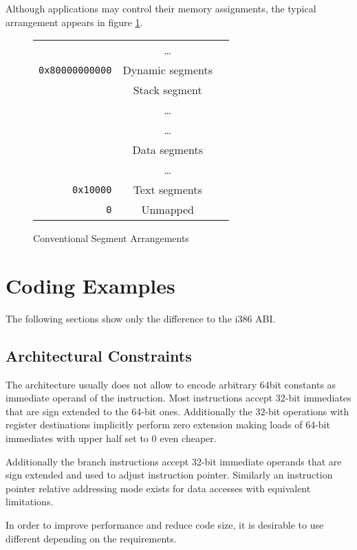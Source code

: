 Although applications may control their memory assignments, the typical
arrangement appears in figure \ref{fig-cfg}.

\begin{figure}[H]
\Hrule
  \caption{Conventional Segment Arrangements}
  \label{fig-cfg}
  \begin{center}
    \begin{tabular}{r|c|l}
      \cline{2-2}
      & \dots & \\
      \verb|0x80000000000| & Dynamic segments & \\ \cline{2-2}
      & Stack segment & \\ 
      & \dots & \\ \cline{2-2}
      & \dots & \\
      & Data segments & \\ \cline{2-2}
      & \dots & \\
      \verb|0x10000| & Text segments & \\ \cline{2-2}
      \verb|0| & Unmapped & \\ \cline{2-2}
    \end{tabular}
  \end{center}
\Hrule
\end{figure}

\section{Coding Examples}

The following sections show only the difference to the i386 ABI.

\subsection{Architectural Constraints}

The \xARCH architecture usually does not allow to encode arbitrary
64bit constants as immediate operand of the instruction.  Most
instructions accept 32-bit immediates that are sign extended to the
64-bit ones.  Additionally the 32-bit operations with register
destinations implicitly perform zero extension making loads of 64-bit
immediates with upper half set to 0 even cheaper.

Additionally the branch instructions accept 32-bit immediate operands
that are sign extended and used to adjust instruction pointer.
Similarly an instruction pointer relative addressing mode exists for
data accesses with equivalent limitations.

In order to improve performance and reduce code size, it is desirable
to use different  depending on the
requirements.

